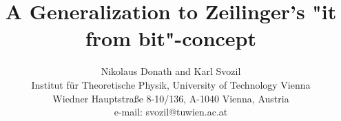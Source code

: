
\documentclass[12pt,a4paper]{article}
\usepackage{amsmath}
\usepackage{amssymb}


\sloppy



\title{A Generalization to Zeilinger's "it from bit"-concept}
\author{Nikolaus Donath and Karl Svozil\\
 {\small Institut f\"ur Theoretische Physik, University of Technology Vienna }     \\
  {\small Wiedner Hauptstra\ss e 8-10/136,}
  {\small A-1040 Vienna, Austria   }            \\
  {\small e-mail: svozil@tuwien.ac.at}}
\date{ }
\maketitle


Given a euklidean vector space in $N=2^n$ dimensions, we pose the following question:
Give all propostions to uniquely distinguish then $N$ vectors that form the basis. How many different sets of propsitions can be defined? What are the propostions for an arbitrary basis?


